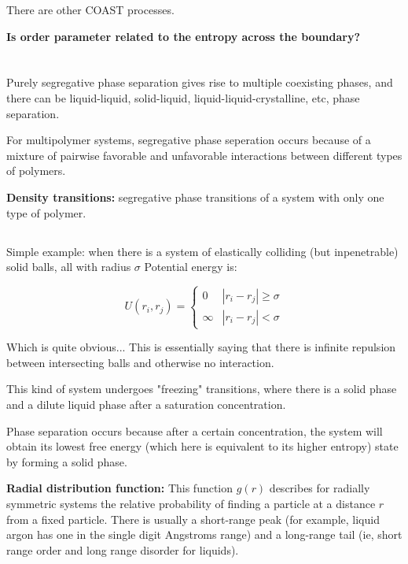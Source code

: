 \documentclass{article}
\begin{document}
There are other COAST processes.

\textbf{Is order parameter related to the entropy across the boundary?}

\section{}

Purely segregative phase separation gives rise to multiple coexisting phases, and there can be liquid-liquid, solid-liquid, liquid-liquid-crystalline, etc, phase separation.

For multipolymer systems, segregative phase seperation occurs because of a mixture of pairwise favorable and unfavorable interactions between different types of polymers.

\textbf{Density transitions: } segregative phase transitions of a system with only one type of polymer.

\subsection{}

Simple example: when there is a system of elastically colliding (but inpenetrable) solid balls, all with radius $\sigma$ Potential energy is:

\[U(r_i,r_j)=\begin{cases}
    0 & |r_i-r_j| \geq \sigma\\
    \infty & |r_i-r_j| < \sigma
\end{cases}\]

Which is quite obvious... This is essentially saying that there is infinite repulsion between intersecting balls and otherwise no interaction.

This kind of system undergoes "freezing" transitions, where there is a solid phase and a dilute liquid phase after a saturation concentration.

Phase separation occurs because after a certain concentration, the system will obtain its lowest free energy (which here is equivalent to its higher entropy) state by forming a solid phase.

\textbf{Radial distribution function: } This function $g(r)$ describes for radially symmetric systems the relative probability of finding a particle at a distance $r$ from a fixed particle. There is usually a short-range peak (for example, liquid argon has one in the single digit Angstroms range) and a long-range tail (ie, short range order and long range disorder for liquids).
\end{document}
